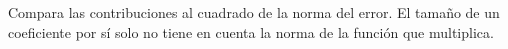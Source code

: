 Compara las contribuciones al cuadrado de la norma del error. El tamaño de un coeficiente por sí solo no tiene en cuenta la norma de la función que multiplica.
